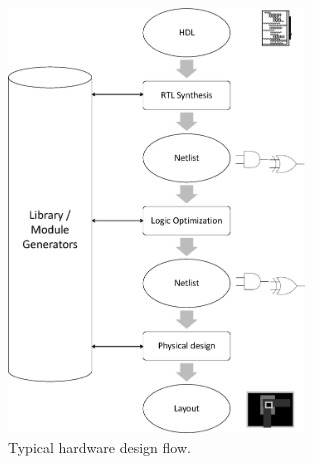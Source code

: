 \begin{figure}[bp]
\centerline{
\includegraphics[width=0.7\textwidth]{newfig/designflow.eps}
}
\caption{Typical hardware design flow.}
\label{fig:designflow}
\end{figure}

